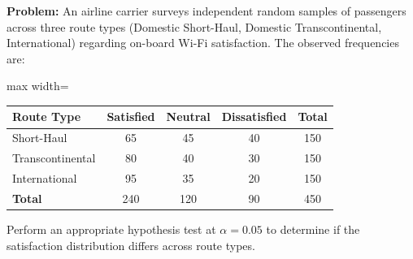 \begin{frqrubricbox}
\textbf{Problem:} An airline carrier surveys independent random samples of passengers across three route types (Domestic Short-Haul, Domestic Transcontinental, International) regarding on-board Wi-Fi satisfaction. 
The observed frequencies are:
\begin{center}
\begin{adjustbox}{max width=\linewidth}
\begin{tabular}{lcccc}
\toprule
\textbf{Route Type} & \textbf{Satisfied} & \textbf{Neutral} & \textbf{Dissatisfied} & \textbf{Total} \\
\midrule
Short-Haul & 65 & 45 & 40 & 150 \\
Transcontinental & 80 & 40 & 30 & 150 \\
International & 95 & 35 & 20 & 150 \\
\midrule
\textbf{Total} & 240 & 120 & 90 & 450 \\
\bottomrule
\end{tabular}
\end{adjustbox}
\end{center}
Perform an appropriate hypothesis test at $\alpha = 0.05$ to determine if the satisfaction distribution differs across route types.


\end{frqrubricbox}
